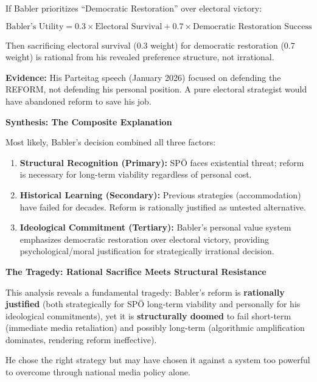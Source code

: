 If Babler prioritizes ``Democratic Restoration'' over electoral victory:

\[
\text{Babler's Utility} = 0.3 \times \text{Electoral Survival} + 0.7 \times \text{Democratic Restoration Success}
\]

Then sacrificing electoral survival (0.3 weight) for democratic restoration (0.7 weight) is
rational from his revealed preference structure, not irrational.

\textbf{Evidence:} His Parteitag speech (January 2026) focused on defending the REFORM, not defending
his personal position. A pure electoral strategist would have abandoned reform to save his job.

\vspace{0.5cm}

\textbf{Synthesis: The Composite Explanation}

Most likely, Babler's decision combined all three factors:

\begin{enumerate}
\item \textbf{Structural Recognition (Primary):} SPÖ faces existential threat; reform is necessary for
  long-term viability regardless of personal cost.

\item \textbf{Historical Learning (Secondary):} Previous strategies (accommodation) have failed for decades.
  Reform is rationally justified as untested alternative.

\item \textbf{Ideological Commitment (Tertiary):} Babler's personal value system emphasizes democratic
  restoration over electoral victory, providing psychological/moral justification for strategically
  irrational decision.

\end{enumerate}

\textbf{The Tragedy: Rational Sacrifice Meets Structural Resistance}

This analysis reveals a fundamental tragedy: Babler's reform is \textbf{rationally justified}
(both strategically for SPÖ long-term viability and personally for his ideological commitments),
yet it is \textbf{structurally doomed} to fail short-term (immediate media retaliation) and
possibly long-term (algorithmic amplification dominates, rendering reform ineffective).

He chose the right strategy but may have chosen it against a system too powerful to overcome
through national media policy alone.

